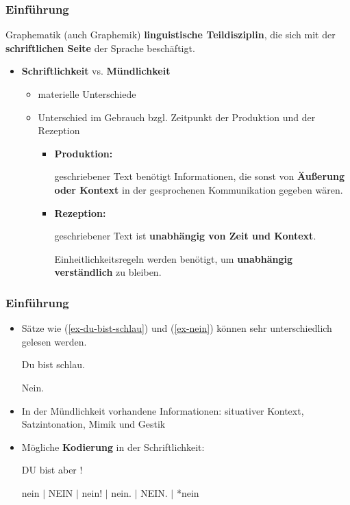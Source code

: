 \begin{frame}
\frametitle{Einführung}

\begin{block}{Graphematik}
	(auch Graphemik) \textbf{linguistische Teildisziplin}, die sich mit der \textbf{schriftlichen Seite} der Sprache beschäftigt. 
\end{block}

\pause 

\begin{itemize}

	\item \textbf{Schriftlichkeit} vs. \textbf{Mündlichkeit}
	
	\begin{itemize}
		\item materielle Unterschiede
		\item Unterschied im Gebrauch bzgl. Zeitpunkt der Produktion und der Rezeption
		
		\begin{itemize}
			\item  \textbf{Produktion:} 
			
			geschriebener Text benötigt Informationen, die sonst von \textbf{Äußerung oder Kontext} in der gesprochenen Kommunikation gegeben wären.
	
			\item \textbf{Rezeption:} 
			
			geschriebener Text ist \textbf{unabhängig von Zeit und Kontext}.
			
			Einheitlichkeitsregeln werden benötigt, um \textbf{unabhängig verständlich} zu bleiben.
		\end{itemize}

	\end{itemize} 

\end{itemize}

\end{frame}


\begin{frame}
\frametitle{Einführung}

\begin{itemize}
	\item Sätze wie (\ref{ex-du-bist-schlau}) und (\ref{ex-nein}) können sehr unterschiedlich gelesen werden.

	\ea\label{ex-du-bist-schlau}
	Du bist schlau.

	\ex\label{ex-nein}
	Nein.
	\z
	
\pause		

\item In der Mündlichkeit vorhandene Informationen: situativer Kontext, Satzintonation, Mimik und Gestik

\item Mögliche \textbf{Kodierung} in der Schriftlichkeit:

	\ea
	DU bist aber !

	\ex 
	nein $|$ NEIN $|$ nein! $|$ nein. $|$ NEIN. $|$ *nein
	\z

\end{itemize}		

\end{frame}


